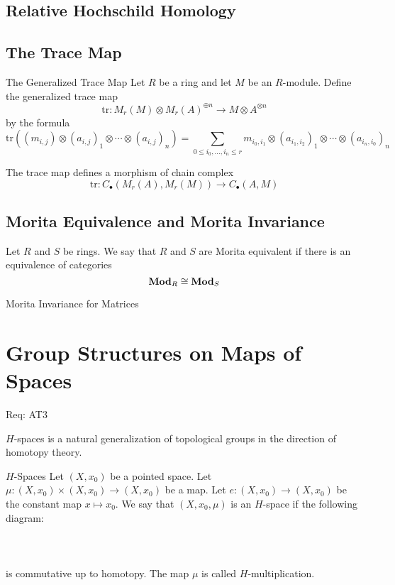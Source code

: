 \documentclass[a4paper]{article}
\begin{document}
\subsection{Relative Hochschild Homology}

\subsection{The Trace Map}
\begin{defn}{The Generalized Trace Map}{} Let $R$ be a ring and let $M$ be an $R$-module. Define the generalized trace map $$\text{tr}:M_r(M)\otimes M_r(A)^{\oplus n}\to M\otimes A^{\otimes n}$$ by the formula $$\text{tr}((m_{i,j})\otimes (a_{i,j})_1\otimes\cdots\otimes(a_{i,j})_n)=\sum_{0\leq i_0,\dots,i_n\leq r}m_{i_0,i_1}\otimes (a_{i_1,i_2})_1\otimes\cdots\otimes (a_{i_n,i_0})_n$$
\end{defn}

\begin{thm}{}{} The trace map defines a morphism of chain complex $$\text{tr}:C_\bullet(M_r(A),M_r(M))\to C_\bullet(A,M)$$
\end{thm}

\subsection{Morita Equivalence and Morita Invariance}
\begin{defn}{}{} Let $R$ and $S$ be rings. We say that $R$ and $S$ are Morita equivalent if there is an equivalence of categories $$\bold{Mod}_R\cong\bold{Mod}_S$$
\end{defn}

\begin{thm}{Morita Invariance for Matrices}{}
\end{thm}

\pagebreak
\section{Group Structures on Maps of Spaces}

Req: AT3

$H$-spaces is a natural generalization of topological groups in the direction of homotopy theory. 

\begin{defn}{$H$-Spaces}{} Let $(X,x_0)$ be a pointed space. Let $\mu:(X,x_0)\times(X,x_0)\to(X,x_0)$ be a map. Let $e:(X,x_0)\to(X,x_0)$ be the constant map $x\mapsto x_0$. We say that $(X,x_0,\mu)$ is an $H$-space if the following diagram: \\~\\
\\~\\
is commutative up to homotopy. The map $\mu$ is called $H$-multiplication. 
\end{defn}
\end{document}
